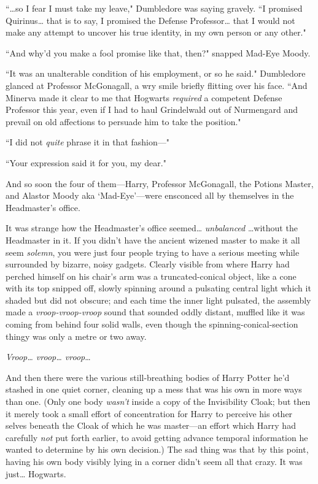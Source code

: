 
``{\ldots}so I fear I must take my leave," Dumbledore was saying gravely. ``I promised Quirinus{\ldots} that is to say, I promised the Defense Professor{\ldots} that I would not make any attempt to uncover his true identity, in my own person or any other."

``And why'd you make a fool promise like that, then?" snapped Mad-Eye Moody.

``It was an unalterable condition of his employment, or so he said." Dumbledore glanced at Professor McGonagall, a wry smile briefly flitting over his face. ``And Minerva made it clear to me that Hogwarts \emph{required} a competent Defense Professor this year, even if I had to haul Grindelwald out of Nurmengard and prevail on old affections to persuade him to take the position."

``I did not \emph{quite} phrase it in that fashion—"

``Your expression said it for you, my dear."

And so soon the four of them—Harry, Professor McGonagall, the Potions Master, and Alastor Moody aka `Mad-Eye'—were ensconced all by themselves in the Headmaster's office.

It was strange how the Headmaster's office seemed{\ldots} \emph{unbalanced} {\ldots}without the Headmaster in it. If you didn't have the ancient wizened master to make it all seem \emph{solemn}, you were just four people trying to have a serious meeting while surrounded by bizarre, noisy gadgets. Clearly visible from where Harry had perched himself on his chair's arm was a truncated-conical object, like a cone with its top snipped off, slowly spinning around a pulsating central light which it shaded but did not obscure; and each time the inner light pulsated, the assembly made a \emph{vroop-vroop-vroop} sound that sounded oddly distant, muffled like it was coming from behind four solid walls, even though the spinning-conical-section thingy was only a metre or two away.

\emph{Vroop{\ldots} vroop{\ldots} vroop}{\ldots}

And then there were the various still-breathing bodies of Harry Potter he'd stashed in one quiet corner, cleaning up a mess that was his own in more ways than one. (Only one body \emph{wasn't} inside a copy of the Invisibility Cloak; but then it merely took a small effort of concentration for Harry to perceive his other selves beneath the Cloak of which he was master—an effort which Harry had carefully \emph{not} put forth earlier, to avoid getting advance temporal information he wanted to determine by his own decision.) The sad thing was that by this point, having his own body visibly lying in a corner didn't seem all that crazy. It was just{\ldots} Hogwarts.

